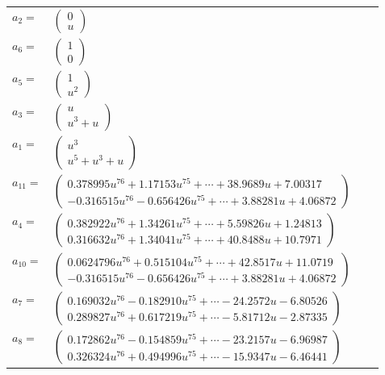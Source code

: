 \documentclass[1p]{elsarticle_modified}
\theoremstyle{definition}
\begin{document}
\begin{tabular}{m{7pt} m{180pt} m{7pt} m{180pt} }
\flushright $a_{2}=$&$\begin{pmatrix}0\\u\end{pmatrix}$ \\
\flushright $a_{6}=$&$\begin{pmatrix}1\\0\end{pmatrix}$ \\
\flushright $a_{5}=$&$\begin{pmatrix}1\\u^2\end{pmatrix}$ \\
\flushright $a_{3}=$&$\begin{pmatrix}u\\u^3+u\end{pmatrix}$ \\
\flushright $a_{1}=$&$\begin{pmatrix}u^3\\u^5+u^3+u\end{pmatrix}$ \\
\flushright $a_{11}=$&$\begin{pmatrix}0.378995 u^{76}+1.17153 u^{75}+\cdots+38.9689 u+7.00317\\-0.316515 u^{76}-0.656426 u^{75}+\cdots+3.88281 u+4.06872\end{pmatrix}$ \\
\flushright $a_{4}=$&$\begin{pmatrix}0.382922 u^{76}+1.34261 u^{75}+\cdots+5.59826 u+1.24813\\0.316632 u^{76}+1.34041 u^{75}+\cdots+40.8488 u+10.7971\end{pmatrix}$ \\
\flushright $a_{10}=$&$\begin{pmatrix}0.0624796 u^{76}+0.515104 u^{75}+\cdots+42.8517 u+11.0719\\-0.316515 u^{76}-0.656426 u^{75}+\cdots+3.88281 u+4.06872\end{pmatrix}$ \\
\flushright $a_{7}=$&$\begin{pmatrix}0.169032 u^{76}-0.182910 u^{75}+\cdots-24.2572 u-6.80526\\0.289827 u^{76}+0.617219 u^{75}+\cdots-5.81712 u-2.87335\end{pmatrix}$ \\
\flushright $a_{8}=$&$\begin{pmatrix}0.172862 u^{76}-0.154859 u^{75}+\cdots-23.2157 u-6.96987\\0.326324 u^{76}+0.494996 u^{75}+\cdots-15.9347 u-6.46441\end{pmatrix}$ \\

\end{tabular}
\end{document}
